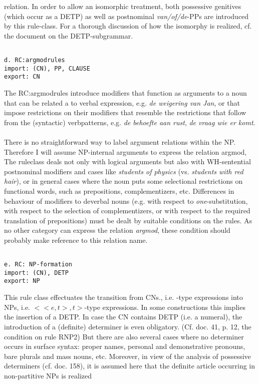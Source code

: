 relation. In order to allow an isomorphic treatment, both possessive genitives
(which occur as a DETP) as well as postnominal {\em van/of/de}-PPs are
introduced by this rule-class. For a thorough discussion of how the isomorphy
is realized, cf. the document on the DETP-subgrammar.
\begin{verbatim}

d. RC:argmodrules 
import: (CN), PP, CLAUSE
export: CN
\end{verbatim}
The RC:argmodrules introduce 
modifiers that function as arguments to a noun that can be related a to
verbal expression, e.g. {\em de weigering van Jan}, or that impose restrictions
on their modifiers that resemble the restrictions that follow from the
(syntactic) verbpatterns, e.g. {\em de behoefte aan rust}, {\em de vraag wie er
komt}.
\\ \\
There is no straightforward way to label argument relations within the NP.
Therefore I will assume NP-internal arguments to express the relation argmod,
The ruleclass deals not only with
logical arguments but also with WH-sentential postnominal modifiers and cases
like {\em students of physics} (vs. {\em students with red hair}), or in
general cases where the noun puts some selectional restrictions on functional
words, such as prepositions, complementizers, etc. Differences in behaviour of
modifiers to deverbal nouns (e.g. with respect to {\em one}-substitution, with
respect to the selection of complementizers, or with respect to the required
translation of prepositions) must be dealt by suitable conditions on the rules.
As no other category can express the relation {\em argmod}, these condition
should probably make reference to this relation name.
\begin{verbatim}

e. RC: NP-formation
import: (CN), DETP
export: NP
\end{verbatim}
This rule class effectuates the transition from CNs., i.e. \(<e,t>\)-type
expressions into NPs, i.e. \(<<e,t>,t>\)-type 
expressions. In some constructions
this implies the insertion of a DETP. In case the CN contains DETP (i.e. a
numeral), the introduction of a (definite) determiner is even obligatory. (Cf.
doc. 41, p. 12, the condition on rule RNP2) But there are also several cases
where no determiner occurs in surface syntax: proper names, personal and
demonstrative pronouns, bare plurals and mass nouns, etc. Moreover, in view of
the analysis of possessive determiners (cf. doc. 158), it is assumed here that
the definite article occurring in non-partitive NPs is realized
